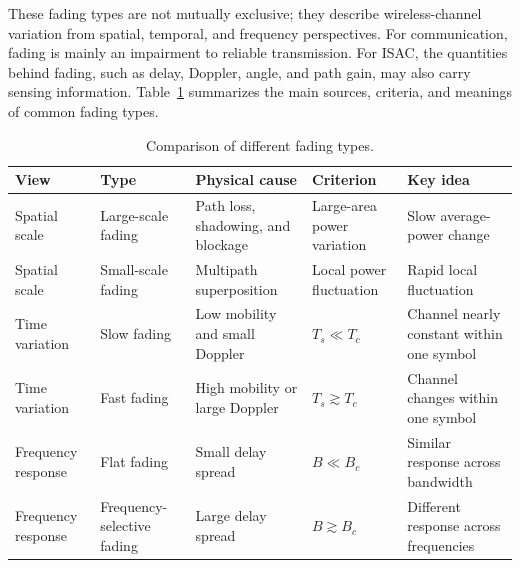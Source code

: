 These fading types are not mutually exclusive; they describe wireless-channel
variation from spatial, temporal, and frequency perspectives.
For communication, fading is mainly an impairment to reliable transmission.
For ISAC, the quantities behind fading, such as delay, Doppler, angle, and path
gain, may also carry sensing information.
Table~\ref{tab:fading-types-comparison} summarizes the main sources, criteria,
and meanings of common fading types.
\begin{table}[htbp]
    \centering
    \caption{Comparison of different fading types.}
    \label{tab:fading-types-comparison}
    \small
    \renewcommand{\arraystretch}{1.25}
    \begin{tabularx}{\textwidth}{
        >{\raggedright\arraybackslash}p{}
        >{\raggedright\arraybackslash}p{}
        >{\raggedright\arraybackslash}p{}
        >{\centering\arraybackslash}p{}
        >{\raggedright\arraybackslash}X
    }
        \toprule
        \textbf{View}
        &
        \textbf{Type}
        &
        \textbf{Physical cause}
        &
        \textbf{Criterion}
        &
        \textbf{Key idea}
        \\
        \midrule

        Spatial scale
        &
        Large-scale fading
        &
        Path loss, shadowing, and blockage
        &
        Large-area power variation
        &
        Slow average-power change
        \\

        Spatial scale
        &
        Small-scale fading
        &
        Multipath superposition
        &
        Local power fluctuation
        &
        Rapid local fluctuation
        \\

        Time variation
        &
        Slow fading
        &
        Low mobility and small Doppler
        &
        \(T_s \ll T_c\)
        &
        Channel nearly constant within one symbol
        \\

        Time variation
        &
        Fast fading
        &
        High mobility or large Doppler
        &
        \(T_s \gtrsim T_c\)
        &
        Channel changes within one symbol
        \\

        Frequency response
        &
        Flat fading
        &
        Small delay spread
        &
        \(B \ll B_c\)
        &
        Similar response across bandwidth
        \\

        Frequency response
        &
        Frequency-selective fading
        &
        Large delay spread
        &
        \(B \gtrsim B_c\)
        &
        Different response across frequencies
        \\
        \bottomrule
    \end{tabularx}
\end{table}


